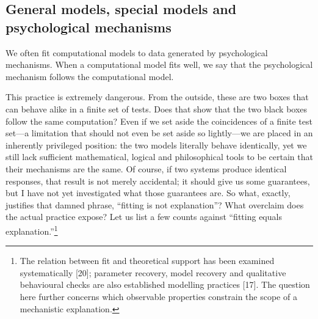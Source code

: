 \documentclass[11pt,a4paper]{article}
\begin{document}
\subsection{General models, special models and psychological
mechanisms}\label{general-models-special-models-and-psychological-mechanisms}

We often fit computational models to data generated by psychological
mechanisms. When a computational model fits well, we say that the
psychological mechanism follows the computational model.

This practice is extremely dangerous. From the outside, these are two
boxes that can behave alike in a finite set of tests. Does that show
that the two black boxes follow the same computation? Even if we set
aside the coincidences of a finite test set—a limitation that should
not even be set aside so lightly—we are placed in an inherently
privileged position: the two models literally behave identically, yet we
still lack sufficient mathematical, logical and philosophical tools to
be certain that their mechanisms are the same. Of course, if two systems
produce identical responses, that result is not merely accidental; it
should give us some guarantees, but I have not yet investigated what
those guarantees are. So what, exactly, justifies that damned phrase,
“fitting is not explanation”? What overclaim does the actual practice
expose? Let us list a few counts against “fitting equals
explanation.”\footnote{The relation between fit and theoretical support
  has been examined systematically {[}20{]}; parameter recovery, model
  recovery and qualitative behavioural checks are also established
  modelling practices {[}17{]}. The question here further concerns which
  observable properties constrain the scope of a mechanistic
  explanation.}
\end{document}
